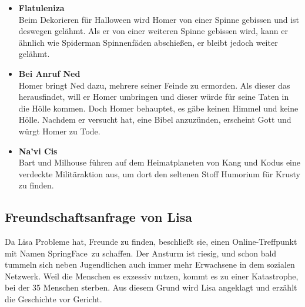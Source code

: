 \begin{itemize}
	\item \textbf{Flatuleniza}\\ Beim Dekorieren für Halloween wird Homer von einer Spinne gebissen und ist deswegen gelähmt. Als er von einer weiteren Spinne gebissen wird, kann er ähnlich wie Spiderman Spinnenfäden abschießen, er bleibt jedoch weiter gelähmt. 
	\item \textbf{Bei Anruf Ned}\\ Homer bringt Ned dazu, mehrere seiner Feinde zu ermorden. Als dieser das herausfindet, will er Homer umbringen und dieser würde für seine Taten in die Hölle kommen. Doch Homer behauptet, es gäbe keinen Himmel und keine Hölle. Nachdem er versucht hat, eine Bibel anzuzünden, erscheint Gott und würgt Homer zu Tode. 
	\item \textbf{Na'vi Cis}\\ Bart und Milhouse führen auf dem Heimatplaneten von Kang und Kodus eine verdeckte Militäraktion aus, um dort den seltenen Stoff Humorium für Krusty zu finden.
\end{itemize}


\subsection{Freundschaftsanfrage von Lisa}\label{PABF04}
Da Lisa Probleme hat, Freunde zu finden, beschließt sie, einen Online-Treffpunkt mit Namen \glqq SpringFace\grqq\ zu schaffen. Der Ansturm ist riesig, und schon bald tummeln sich neben Jugendlichen auch immer mehr Erwachsene in dem sozialen Netzwerk. Weil die Menschen es exzessiv nutzen, kommt es zu einer Katastrophe, bei der 35 Menschen sterben. Aus diesem Grund wird Lisa angeklagt und erzählt die Geschichte vor Gericht.


